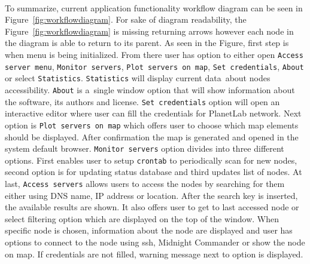 {{{{{{{\paragraph{} To summarize, current application functionality workflow diagram can be seen in Figure~\ref{fig:workflowdiagram}. For sake of diagram readability, the Figure~\ref{fig:workflowdiagram} is missing returning arrows however each node in the diagram is able to return to its parent. As seen in the Figure, first step is when menu is being initialized. From there user has option to either open \texttt{Access server menu}, \texttt{Monitor servers}, \texttt{Plot servers on map}, \texttt{Set credentials}, \texttt{About} or select \texttt{Statistics}. \texttt{Statistics} will display current data~about nodes accessibility. \texttt{About} is a~single window option that will show information about the software, its authors and license. \texttt{Set credentials} option will open an interactive editor where user can fill the credentials for PlanetLab network. Next option is \texttt{Plot servers on map} which offers user to choose which map elements should be displayed. After confirmation the map is generated and opened in the system default browser. \texttt{Monitor servers} option divides into three different options. First enables user to setup \texttt{crontab} to periodically scan for new nodes, second option is for updating status database and third updates list of nodes. At last, \texttt{Access servers} allows users to access the nodes by searching for them either using DNS name, IP address or location. After the search key is inserted, the available results are shown. It also offers user to get to last accessed node or select filtering option which are displayed on the top of the window. When specific node is chosen, information about the node are displayed and user has options to connect to the node using ssh, Midnight Commander or show the node on map. If credentials are not filled, warning message next to option is displayed.

}}}}}}}

